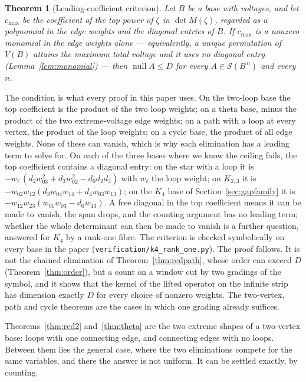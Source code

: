 \documentclass[11pt]{article}
\newtheorem{theorem}{Theorem}
\theoremstyle{definition}
\begin{document}
\begin{theorem}[Leading-coefficient criterion]\label{thm:leading}
Let $B$ be a base with voltages, and let $c_{\max}$ be the coefficient of the
top power of $\zeta$ in $\det M(\zeta)$, regarded as a polynomial in the edge
weights and the diagonal entries of $B$. If $c_{\max}$ is a nonzero monomial in
the edge weights alone --- equivalently, a unique permutation of $V(B)$ attains
the maximum total voltage and it uses no diagonal entry
(Lemma~\ref{lem:monomial}) --- then $\operatorname{null}A\le D$ for every
$A\in\mathcal S(B^{\,n})$ and every $n$.
\end{theorem}

\noindent
The condition is what every proof in this paper uses. On the two-loop base the
top coefficient is the product of the two loop weights; on a theta base, minus
the product of the two extreme-voltage edge weights; on a path with a loop at
every vertex, the product of the loop weights; on a cycle base, the product of
all edge weights. None of these can vanish, which is why each elimination has a
leading term to solve for. On each of the three bases where we know the ceiling
fails, the top coefficient contains a diagonal entry: on the star with a loop it
is $-w_{\ell}\,(d_2w_{03}^{2}+d_3w_{02}^{2}-d_0d_2d_3)$ with $w_\ell$ the loop
weight; on $K_{2,3}$ it is $-w_{02}w_{12}(d_3w_{04}w_{14}+d_4w_{03}w_{13})$; on
the $K_4$ base of Section~\ref{sec:gapfamily} it is
$-w_{12}w_{23}(w_{01}w_{03}-d_0w_{13})$. A free diagonal in the top coefficient
means it can be made to vanish, the span drops, and the counting argument has no
leading term; whether the whole determinant can then be made to vanish is a
further question, answered for $K_4$ by a rank-one fibre. The criterion is
checked symbolically on every base in the paper
(\texttt{verification/k4\_rank\_one.py}). The proof follows. It is not the
chained elimination of Theorem~\ref{thm:redpath}, whose order can exceed $D$
(Theorem~\ref{thm:order}), but a count on a window cut by two gradings of the
symbol, and it shows that the kernel of the lifted operator on the infinite
strip has dimension exactly $D$ for every choice of nonzero weights. The
two-vertex, path and cycle theorems are the cases in which one grading already
suffices.



\noindent
Theorems~\ref{thm:red2} and~\ref{thm:theta} are the two extreme shapes of a
two-vertex base: loops with one connecting edge, and connecting edges with no
loops. Between them lies the general case, where the two eliminations compete
for the same variables, and there the answer is not uniform. It can be settled
exactly, by counting.
\end{document}
